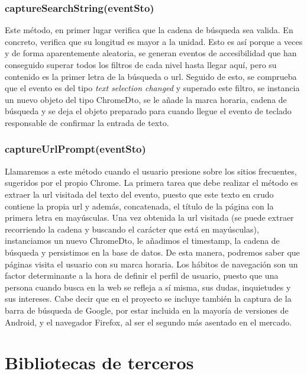 \documentclass[12pt,a4paper,oneside]{book} %
\begin{document}
\subsubsection{captureSearchString(eventSto)}
Este método, en primer lugar verifica que la cadena de búsqueda sea valida. En concreto, verifica que su longitud es mayor a la unidad. Esto es así porque a veces y de forma aparentemente aleatoria, se generan eventos de accesibilidad que han conseguido superar todos los filtros de cada nivel hasta llegar aquí, pero su contenido es la primer letra de la búsqueda o url. 
\newline \newline 
Seguido de esto, se comprueba que el evento es del tipo \textit{text selection changed} y superado este filtro, se instancia un nuevo objeto del tipo ChromeDto, se le añade la marca horaria, cadena de búsqueda y se deja el objeto preparado para cuando llegue el evento de teclado responsable de confirmar la entrada de texto. 
\subsubsection{captureUrlPrompt(eventSto)}
Llamaremos a este método cuando el usuario presione sobre los sitios frecuentes, sugeridos por el propio Chrome. 
\newline \newline 
La primera tarea que debe realizar el método es extraer la url visitada del texto del evento, puesto que este texto en crudo contiene la propia url y además, concatenada, el título de la página con la primera letra en mayúsculas. 
\newline \newline 
Una vez obtenida la url visitada (se puede extraer recorriendo la cadena y buscando el carácter que está en mayúsculas), instanciamos un nuevo ChromeDto, le añadimos el timestamp, la cadena de búsqueda y persistimos en la base de datos. 
\newline \newline
De esta manera, podremos saber que páginas visita el usuario con su marca horaria. Los hábitos de navegación son un factor determinante a la hora de definir el perfil de usuario, puesto que una persona cuando busca en la web se refleja a sí misma, sus dudas, inquietudes y sus intereses. Cabe decir que en el proyecto se incluye también la captura de la barra de búsqueda de Google, por estar incluida en la mayoría de versiones de Android, y el navegador Firefox, al ser el segundo más asentado en el mercado. 
\section{Bibliotecas de terceros}
\end{document}
